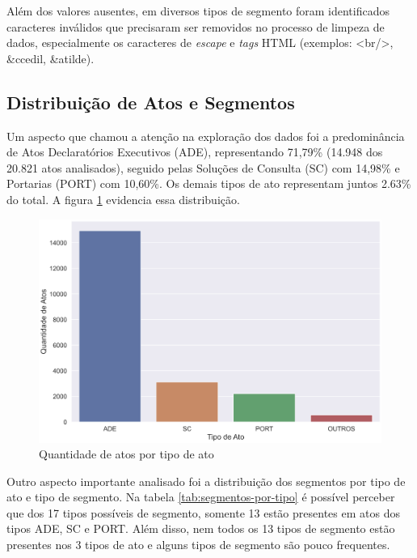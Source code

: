 Além dos valores ausentes, em diversos tipos de segmento foram identificados caracteres inválidos que precisaram ser removidos no processo de limpeza de dados, especialmente os caracteres de \textit{escape} e \textit{tags} HTML (exemplos: <br/>, \&ccedil, \&atilde).

\subsection{Distribuição de Atos e Segmentos \label{sec:dist-atos-segmentos}}

Um aspecto que chamou a atenção na exploração dos dados foi a predominância de Atos Declaratórios Executivos (ADE), representando 71,79\% (14.948 dos 20.821 atos analisados), seguido pelas Soluções de Consulta (SC) com 14,98\% e Portarias (PORT) com 10,60\%. Os demais tipos de ato representam juntos 2.63\% do total. A figura \ref{fig:atos-por-tipo-ato} evidencia essa distribuição.

\begin{figure}[h]
	\caption{Quantidade de atos por tipo de ato}
	\center
	\label{fig:atos-por-tipo-ato}
	\includegraphics[scale=1.9]{exploratoria/atos-por-tipo-ato.png}
	\fdp
\end{figure}

Outro aspecto importante analisado foi a distribuição dos segmentos por tipo de ato e tipo de segmento. Na tabela \ref{tab:segmentos-por-tipo} é possível perceber que dos 17 tipos possíveis de segmento, somente 13 estão presentes em atos dos tipos ADE, SC e PORT. Além disso, nem todos os 13 tipos de segmento estão presentes nos 3 tipos de ato e alguns tipos de segmento são pouco frequentes.

